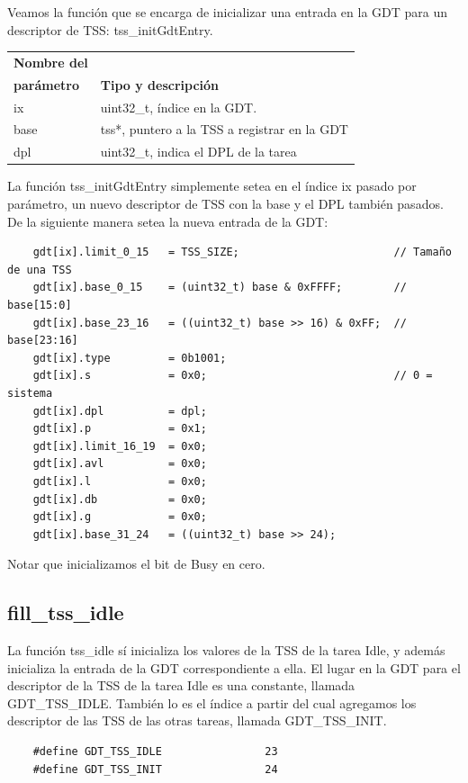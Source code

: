 \documentclass[a4paper]{article}
\newenvironment{codesnippet}{%
	\begin{Sbox}\begin{minipage}{\textwidth}\sffamily\small}%
	{\end{minipage}\end{Sbox}%
		\begin{center}%
		\vspace{-0.4cm}\colorbox{litegrey}{\TheSbox}\end{center}\vspace{0.3cm}}
\begin{document}
Veamos la función que se encarga de inicializar una entrada en la GDT para un descriptor de TSS: tss\_initGdtEntry.

\begin{center}
  \label{tab:table3}
  \begin{tabular}{l|l} %
    \textbf{Nombre del} & \\ 
    \textbf{parámetro} &  \textbf{Tipo y descripción}\\
    \hline
    ix & uint32_t, índice en la GDT.\\
    base & tss*, puntero a la TSS a registrar en la GDT\\
    dpl & uint32_t, indica el DPL de la tarea\\
  \end{tabular}
\end{center}

La función tss\_initGdtEntry simplemente setea en el índice ix pasado por parámetro, un nuevo descriptor de TSS con la
base y el DPL también pasados. De la siguiente manera setea la nueva entrada de la GDT:

\begin{codesnippet}
  \begin{verbatim}
    gdt[ix].limit_0_15   = TSS_SIZE;                        // Tamaño de una TSS
    gdt[ix].base_0_15    = (uint32_t) base & 0xFFFF;        // base[15:0]
    gdt[ix].base_23_16   = ((uint32_t) base >> 16) & 0xFF;  // base[23:16]
    gdt[ix].type         = 0b1001;
    gdt[ix].s            = 0x0;                             // 0 = sistema
    gdt[ix].dpl          = dpl;
    gdt[ix].p            = 0x1;
    gdt[ix].limit_16_19  = 0x0;
    gdt[ix].avl          = 0x0;
    gdt[ix].l            = 0x0;
    gdt[ix].db           = 0x0;
    gdt[ix].g            = 0x0;
    gdt[ix].base_31_24   = ((uint32_t) base >> 24);
  \end{verbatim}
\end{codesnippet}

Notar que inicializamos el bit de Busy en cero.

\subsection{fill_tss_idle}

La función tss_idle sí inicializa los valores de la TSS de la tarea Idle, y además inicializa la entrada de la GDT
correspondiente a ella. El lugar en la GDT para el descriptor de la TSS de la tarea Idle es una constante, llamada 
GDT\_TSS\_IDLE. También lo es el índice a partir del cual agregamos los descriptor de las TSS de las otras tareas,
llamada GDT\_TSS\_INIT.
\begin{codesnippet}
  \begin{verbatim}
	#define GDT_TSS_IDLE                23
	#define GDT_TSS_INIT                24
  \end{verbatim}
\end{codesnippet}
\end{document}
